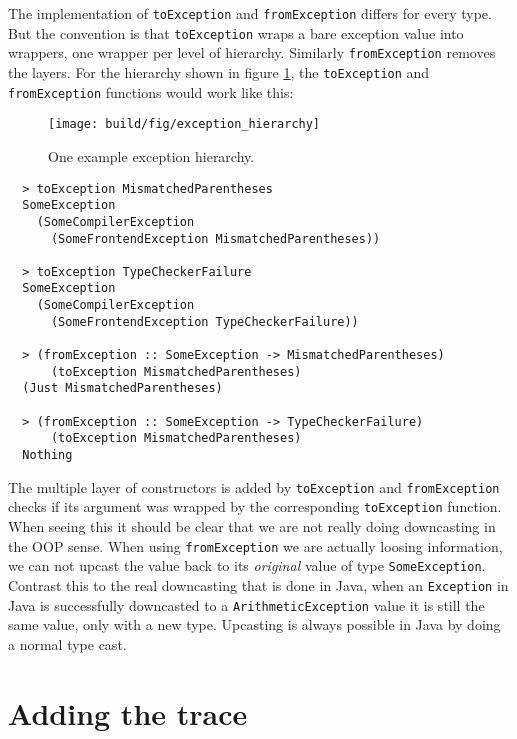 The implementation of \texttt{toException} and \texttt{fromException}
differs for every type. But the convention is that \texttt{toException}
wraps a bare exception value into wrappers, one wrapper per level of
hierarchy. Similarly \texttt{fromException} removes the layers. For the
hierarchy shown in figure \ref{fig:exception_hierarchy}, the
\texttt{toException} and \texttt{fromException} functions would work
like this:

\begin{figure}
\begin{mdframed}
  \texttt{[image: build/fig/exception\_hierarchy]}
  \caption{One example exception hierarchy.}
  \label{fig:exception_hierarchy}
\end{mdframed}
\end{figure}

\begin{verbatim}
  > toException MismatchedParentheses
  SomeException
    (SomeCompilerException
      (SomeFrontendException MismatchedParentheses))

  > toException TypeCheckerFailure
  SomeException
    (SomeCompilerException
      (SomeFrontendException TypeCheckerFailure))

  > (fromException :: SomeException -> MismatchedParentheses)
      (toException MismatchedParentheses)
  (Just MismatchedParentheses)

  > (fromException :: SomeException -> TypeCheckerFailure)
      (toException MismatchedParentheses)
  Nothing
\end{verbatim}

The multiple layer of constructors is added by \texttt{toException}
and \texttt{fromException} checks if its argument was wrapped by the
corresponding \texttt{toException} function. When seeing this it should
be clear that we are not really doing downcasting in the OOP sense. When using
\texttt{fromException} we are actually loosing information, we
can not upcast the value back to its \emph{original} value of type
\texttt{SomeException}. Contrast this to the real downcasting that is
done in Java, when an \texttt{Exception} in Java is successfully
downcasted to a \texttt{ArithmeticException} value it is still the same
value, only with a new type. Upcasting is always possible in Java by
doing a normal type cast.






\section{Adding the trace} \label{sec:adding_the_trace}

